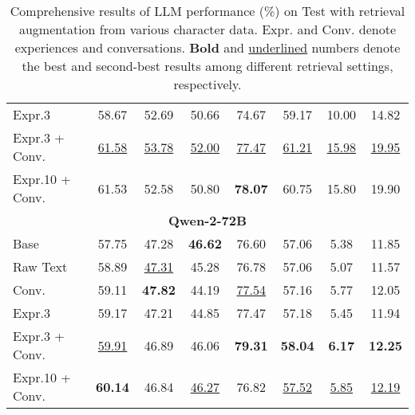 \begin{table*}[htbp]
{\begin{tabular}{lccccccc}
Expr.3 & 58.67 & 52.69 & 50.66 & 74.67 & 59.17 & 10.00 & 14.82 \\
Expr.3 + Conv. & \underline{61.58} & \underline{53.78} & \underline{52.00} & \underline{77.47} & \underline{61.21} & \underline{15.98} & \underline{19.95} \\
Expr.10 + Conv. & 61.53 & 52.58 & 50.80 & \textbf{78.07} & 60.75 & 15.80 & 19.90 \\
\midrule
\multicolumn{8}{c}{\textbf{Qwen-2-72B}} \\
\midrule
Base & 57.75 & 47.28 & \textbf{46.62} & 76.60 & 57.06 & 5.38 & 11.85 \\
Raw Text & 58.89 & \underline{47.31} & 45.28 & 76.78 & 57.06 & 5.07 & 11.57 \\
Conv. & 59.11 & \textbf{47.82} & 44.19 & \underline{77.54} & 57.16 & 5.77 & 12.05 \\
Expr.3 & 59.17 & 47.21 & 44.85 & 77.47 & 57.18 & 5.45 & 11.94 \\
Expr.3 + Conv. & \underline{59.91} & 46.89 & 46.06 & \textbf{79.31} & \textbf{58.04} & \textbf{6.17} & \textbf{12.25} \\
Expr.10 + Conv. & \textbf{60.14} & 46.84 & \underline{46.27} & 76.82 & \underline{57.52} & \underline{5.85} & \underline{12.19} \\
\bottomrule
\end{tabular}}
\caption{
Comprehensive results of LLM performance (\%) on \method Test with retrieval augmentation from various character data. Expr. and Conv. denote experiences and conversations.  
\textbf{Bold} and \underline{underlined} numbers denote the best and second-best results among different retrieval settings, respectively. 
}
\label{tab:rag}
\end{table*}
